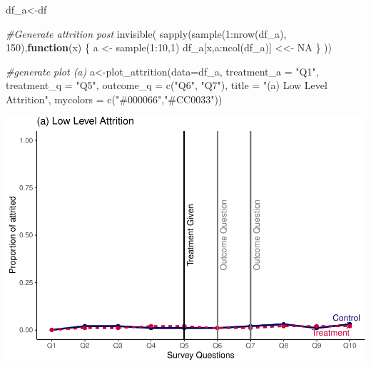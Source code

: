 \documentclass[
]{article}
\newenvironment{Shaded}{\begin{snugshade}}{\end{snugshade}}
\newcommand{\AttributeTok}[1]{\textcolor[rgb]{0.77,0.63,0.00}{#1}}
\newcommand{\CommentTok}[1]{\textcolor[rgb]{0.56,0.35,0.01}{\textit{#1}}}
\newcommand{\ConstantTok}[1]{\textcolor[rgb]{0.00,0.00,0.00}{#1}}
\newcommand{\ControlFlowTok}[1]{\textcolor[rgb]{0.13,0.29,0.53}{\textbf{#1}}}
\newcommand{\DecValTok}[1]{\textcolor[rgb]{0.00,0.00,0.81}{#1}}
\newcommand{\FunctionTok}[1]{\textcolor[rgb]{0.00,0.00,0.00}{#1}}
\newcommand{\NormalTok}[1]{#1}
\newcommand{\OtherTok}[1]{\textcolor[rgb]{0.56,0.35,0.01}{#1}}
\newcommand{\SpecialCharTok}[1]{\textcolor[rgb]{0.00,0.00,0.00}{#1}}
\newcommand{\StringTok}[1]{\textcolor[rgb]{0.31,0.60,0.02}{#1}}
\begin{document}
\begin{Shaded}
\begin{Highlighting}[]
\NormalTok{df\_a}\OtherTok{\textless{}{-}}\NormalTok{df}

\CommentTok{\#Generate attrition post}
\FunctionTok{invisible}\NormalTok{(}
\FunctionTok{sapply}\NormalTok{(}\FunctionTok{sample}\NormalTok{(}\DecValTok{1}\SpecialCharTok{:}\FunctionTok{nrow}\NormalTok{(df\_a), }\DecValTok{150}\NormalTok{),}\ControlFlowTok{function}\NormalTok{(x) \{}
\NormalTok{    a }\OtherTok{\textless{}{-}} \FunctionTok{sample}\NormalTok{(}\DecValTok{1}\SpecialCharTok{:}\DecValTok{10}\NormalTok{,}\DecValTok{1}\NormalTok{)}
\NormalTok{    df\_a[x,a}\SpecialCharTok{:}\FunctionTok{ncol}\NormalTok{(df\_a)] }\OtherTok{\textless{}\textless{}{-}} \ConstantTok{NA}
\NormalTok{\}}
\NormalTok{))}



\CommentTok{\#generate plot (a)}
\NormalTok{a}\OtherTok{\textless{}{-}}\FunctionTok{plot\_attrition}\NormalTok{(}\AttributeTok{data=}\NormalTok{df\_a,}
              \AttributeTok{treatment\_a =} \StringTok{"Q1"}\NormalTok{,}
              \AttributeTok{treatment\_q =} \StringTok{"Q5"}\NormalTok{,}
              \AttributeTok{outcome\_q =}  \FunctionTok{c}\NormalTok{(}\StringTok{"Q6"}\NormalTok{, }\StringTok{"Q7"}\NormalTok{),}
              \AttributeTok{title =} \StringTok{"(a) Low Level Attrition"}\NormalTok{,}
              \AttributeTok{mycolors =} \FunctionTok{c}\NormalTok{(}\StringTok{"\#000066"}\NormalTok{,}\StringTok{"\#CC0033"}\NormalTok{))}
\end{Highlighting}
\end{Shaded}

\includegraphics{paper_replication_files/figure-latex/timeline-1.pdf}
\end{document}
